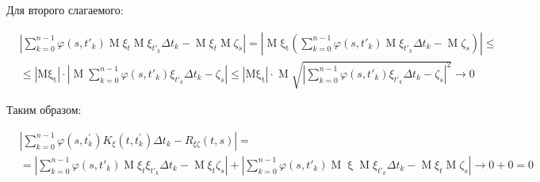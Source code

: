 \documentclass[12 pt]{article}
\begin{document}
	Для второго слагаемого:
	
	\begin{align*}
		&\left| \sum\limits_{k=0}^{n-1} \varphi(s,t'_k)\operatorname{M}\xi_t \operatorname{M}\xi_{t'_k}\Delta t_k - \operatorname{M}\xi_t \operatorname{M}\zeta_s \right| = \left| \operatorname{M}\operatorname{\xi_{t}} \left( \sum\limits_{k=0}^{n-1} \varphi(s,t'_k) \operatorname{M}\xi_{t'_k} \Delta t_k  - \operatorname{M}\zeta_s\right) \right| \leq \\
		& \leq \left|\operatorname{M\xi_t}\right| \cdot \left| \operatorname{M}\sum\limits_{k=0}^{n-1}\varphi(s,t'_k) \xi_{t'_k} \Delta t_k  - \zeta_s\right| \leq 
		\left|\operatorname{M\xi_t}\right| \cdot \operatorname{M} \sqrt{\left| \sum\limits_{k=0}^{n-1} \varphi(s,t'_k) \xi_{t'_k} \Delta t_k - \zeta_s  \right|^2} \longrightarrow 0
	\end{align*}
	
	
	Таким образом:
	
	\begin{align*}
		&\left|\sum\limits_{k=0}^{n-1} \varphi\left(s, t_{k}^{\prime}\right) K_{\xi}\left(t, t_{k}^{\prime}\right) \Delta t_{k}-R_{\xi \zeta}(t, s)\right| = \\
		 &= \left| \sum\limits_{k=0}^{n-1} \varphi(s,t'_k)\operatorname{M}\xi_t\xi_{t'_k}\Delta t_k - \operatorname{M}\xi_t\zeta_s \right| + \left| \sum\limits_{k=0}^{n-1}\varphi(s,t'_k)\operatorname{M}\operatorname{\xi}\operatorname{M}\xi_{t'_k}\Delta t_k - \operatorname{M}\xi_t\operatorname{M}\zeta_s \right|
		  \longrightarrow 0 + 0 = 0 
	\end{align*}
\end{document}
